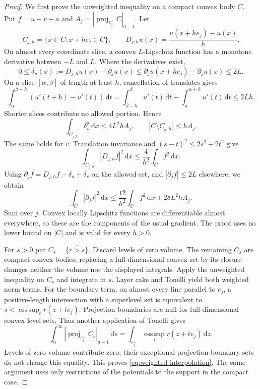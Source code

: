 \documentclass[11pt]{article}
\numberwithin{equation}{section}
\theoremstyle{remark}
\newcommand{\esssup}{\operatorname*{ess\,sup}}
\newcommand{\dd}{\,\mathrm d}
\newcommand{\proj}{\operatorname{proj}}
\begin{document}
\begin{proof}
We first prove the unweighted inequality on a compact convex body $C$. Put $f=u-v-a$ and $A_j=|\proj_{e_j^\perp}C|_{d-1}$. Let
\[
 C_{j,h}=\{x\in C:x+he_j\in C\},\qquad
 D_{j,h}u(x)=\frac{u(x+he_j)-u(x)}h.
\]
On almost every coordinate slice, a convex $L$-Lipschitz function has a monotone derivative between $-L$ and $L$. Where the derivatives exist,
\[
 0\le\delta_u(x):=D_{j,h}u(x)-\partial_j u(x)
 \le\partial_j u(x+he_j)-\partial_j u(x)\le2L.
\]
On a slice $[\alpha,\beta]$ of length at least $h$, cancellation of translates gives
\[
 \int_\alpha^{\beta-h}(u'(t+h)-u'(t))\dd t
 =\int_{\beta-h}^{\beta}u'(t)\dd t-
   \int_\alpha^{\alpha+h}u'(t)\dd t\le2Lh.
\]
Shorter slices contribute no allowed portion. Hence
\[
 \int_{C_{j,h}}\delta_u^2\dd x\le4L^2hA_j,
 \qquad |C\setminus C_{j,h}|\le hA_j.
\]
The same holds for $v$. Translation invariance and $(s-t)^2\le2s^2+2t^2$ give
\[
 \int_{C_{j,h}}|D_{j,h}f|^2\dd x\le\frac4{h^2}\int_C f^2\dd x.
\]
Using $\partial_jf=D_{j,h}f-\delta_u+\delta_v$ on the allowed set, and $|\partial_j f|\le2L$ elsewhere, we obtain
\[
 \int_C|\partial_j f|^2\dd x
 \le\frac{12}{h^2}\int_Cf^2\dd x+28L^2hA_j.
\]
Sum over $j$. Convex locally Lipschitz functions are differentiable almost everywhere, so these are the components of the usual gradient. The proof uses no lower bound on $|C|$ and is valid for every $h>0$.

For $s>0$ put $C_s=\overline{\{r>s\}}$. Discard levels of zero volume. The remaining $C_s$ are compact convex bodies; replacing a full-dimensional convex set by its closure changes neither the volume nor the displayed integrals. Apply the unweighted inequality on $C_s$ and integrate in $s$. Layer cake and Tonelli yield both weighted norm terms. For the boundary term, on almost every line parallel to $e_j$, a positive-length intersection with a superlevel set is equivalent to $s<\esssup_t r(z+te_j)$. Projection boundaries are null for full-dimensional convex level sets. Thus another application of Tonelli gives
\[
 \int_0^\infty|\proj_{e_j^\perp}C_s|_{d-1}\dd s
 =\int_{e_j^\perp}\esssup_t r(z+te_j)\dd z.
\]
Levels of zero volume contribute zero; their exceptional projection-boundary sets do not change this equality. This proves \eqref{eq:weighted-interpolation}. The same argument uses only restrictions of the potentials to the support in the compact case.
\end{proof}
\end{document}
